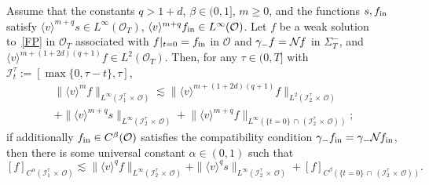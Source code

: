 \documentclass[AHL,Unicode,longabstracts,published]{cedram}
\newcommand*\fin {f_{\rm in}}
\newcommand*\I {\mathcal{I}}
\newcommand*\NN {{\mathcal{N}\hspace{-.3mm}}}
\newcommand*\OO {\mathcal{O}}
\newcommand{\lv}{\langle v\rangle}
\begin{document}
\begin{prop}\label{localr}
Assume that the constants $q>1+d$, $\beta\in(0,1]$, $m\ge0$, and the functions $s,\fin$ satisfy $\lv^{m+q}s\in L^\infty(\OO_T)$, $\lv^{m+q}\fin\in L^\infty(\OO)$. Let $f$ be a weak solution to~\eqref{FP} in $\OO_T$ associated with $f|_{t=0}=\fin$ in $\OO$ and $\gamma_-f=\NN f$ in $\Sigma_T^-$, and $\lv^{m+(1+2d)(q+1)} f\in L^2(\OO_T)$. Then, for any $\tau\in(0,T]$ with $\I_t^\tau:=[\max\{0,\tau-t\},\tau]$,
\begin{multline}\label{bddr}
\big\|\lv^mf\big\|_{L^\infty(\I_1^\tau\,\times\,\OO)}
\lesssim \big\|\lv^{m+(1+2d)(q+1)} f\big\|_{L^2\left(\I_2^\tau\,\times\,\OO\right)}\\
+ \big\|\lv^{m+q}s\big\|_{L^\infty\left(\I_2^\tau\,\times\,\OO\right)} +
\big\|\lv^{m+q}f\big\|_{L^\infty\left(\{t=0\}\,\cap\,\left(\I_2^\tau\,\times\,\OO\right)\right)};
\end{multline}
if additionally $\fin\in C^\beta(\OO)$ satisfies the compatibility condition $\gamma_-\fin=\gamma_-\NN\fin$, then there is some universal constant $\alpha\in(0,1)$ such that
\begin{equation}\label{holderr}
 [f]_{C^\alpha(\I_1^\tau\,\times\,\OO)}
\lesssim \|\lv^{q} f\|_{L^\infty\left(\I_2^\tau\,\times\,\OO\right)} + \|\lv^qs\|_{L^\infty\left(\I_2^\tau\,\times\,\OO\right)} +[f]_{C^\beta
\left(\{t=0\}\,\cap\,\left(\I_2^\tau\,\times\,\OO\right)\right)}.
\end{equation}
\end{prop}
\end{document}
